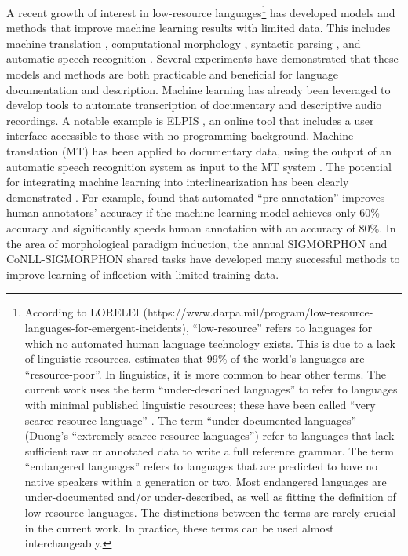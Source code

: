 A recent growth of interest in low-resource languages\footnote{According to LORELEI (https://www.darpa.mil/program/low-resource-languages-for-emergent-incidents), ``low-resource'' refers to languages for which no automated human language technology exists. This is due to a lack of linguistic resources. \citet{szymanski_morphological_2012} estimates that 99\% of the world's languages are ``resource-poor''. In linguistics, it is more common to hear other terms. The current work uses the term ``under-described languages'' to refer to languages with minimal published linguistic resources; these have been called ``very scarce-resource language'' \citep{duong_natural_2017}. The term ``under-documented languages'' (Duong's ``extremely scarce-resource languages'') refer to languages that lack sufficient raw or annotated data to write a full reference grammar. The term ``endangered languages'' refers to languages that are predicted to have no native speakers within a generation or two. Most endangered languages are under-documented and/or under-described, as well as fitting the definition of low-resource languages. The distinctions between the terms are rarely crucial in the current work. In practice, these terms can be used almost interchangeably. } 
has developed models and methods that improve machine learning results with limited data. This includes machine translation \citep{abbott_towards_2018,gu_universal_2018,shearing_improving_2018,al_mumin_neural_2019,duh_benchmarking_2020}, computational morphology \citep{ruokolainen_supervised_2013,baumann_using_2014,micher_improving_2017,moeller_improving_2019}, syntactic parsing \citep{baldridge_learning_2013,duong-etal-2015-low,duong_natural_2017}, and automatic speech recognition \citep{adams_automatic_2017,anastasopoulos_computational_2019}. Several experiments have demonstrated that these models and methods are both practicable and beneficial for language documentation and description. Machine learning has already been leveraged to develop tools to automate transcription of documentary and descriptive audio recordings. A notable example is ELPIS \citep{foley_elpis_2018}, an online tool that includes a user interface accessible to those with no programming background. Machine translation (MT) has been applied to documentary data, using the output of an automatic speech recognition system as input to the MT system \citep{anastasopoulos_unsupervised_2016,duong_attentional_2016}. The potential for integrating machine learning into interlinearization has been clearly demonstrated \citep{baldridge_how_2009,palmer_semi-automated_2009,palmer_computational_2010,xia_enriching_2016}. For example, \citet{felt_improving_2012} found that automated ``pre-annotation'' improves human annotators' accuracy if the machine learning model achieves only 60\% accuracy and significantly speeds human annotation with an accuracy of 80\%. In the area of morphological paradigm induction, the annual SIGMORPHON and CoNLL-SIGMORPHON shared tasks \citep{cotterell_sigmorphon_2016,cotterell_conll-sigmorphon_2017,cotterell_conllsigmorphon_2018,mccarthy-etal-2019-sigmorphon,nicolai_sigmorphonproceedings_2020,sigmorphonproceedings_2021} have developed many successful methods to improve learning of inflection with limited training data. 

